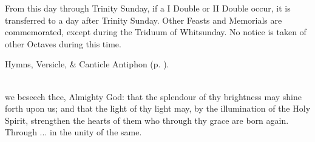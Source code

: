 \clearpage
{}

\begin{rubric}
	From this day through Trinity Sunday, if a I Double or II Double occur, it is transferred to a day after Trinity Sunday. Other Feasts and Memorials are commemorated, except during the Triduum of Whitsunday. No notice is taken of other Octaves during this time.
\end{rubric}

\begin{rubric}
	Hymns, Versicle, \& Canticle Antiphon  (p. \pageref{AscensionSunday}).
\end{rubric}

\\

 we beseech thee, Almighty God: that the splendour of thy brightness may shine forth upon us; and that the light of thy light may, by the illumination of the Holy Spirit, strengthen the hearts of them who through thy grace are born again. Through ... in the unity of the same.


\label{Whitsunday}

\firstEvensong
{}

\firstEvensongHymn\label{WhitsundayEvensongHymn}

